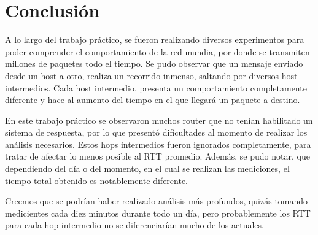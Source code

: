 \section{Conclusión}

A lo largo del trabajo práctico, se fueron realizando diversos experimentos para poder comprender el comportamiento de la red mundia, por donde se transmiten millones de paquetes todo el tiempo. Se pudo observar que un mensaje enviado desde un host a otro, realiza un recorrido inmenso, saltando por diversos host intermedios. Cada host intermedio, presenta un comportamiento completamente diferente y hace al aumento del tiempo en el que llegará un paquete a destino. 

En este trabajo práctico se observaron muchos router que no tenían habilitado un sistema de respuesta, por lo que presentó dificultades al momento de realizar los análisis necesarios. Estos hops intermedios fueron ignorados completamente, para tratar de afectar lo menos posible al RTT promedio. Además, se pudo notar, que dependiendo del día o del momento, en el cual se realizan las mediciones, el tiempo total obtenido es notablemente diferente. 

Creemos que se podrían haber realizado análisis más profundos, quizás tomando medicientes cada diez minutos durante todo un día, pero probablemente los RTT para cada hop intermedio no se diferenciarían mucho de los actuales. 